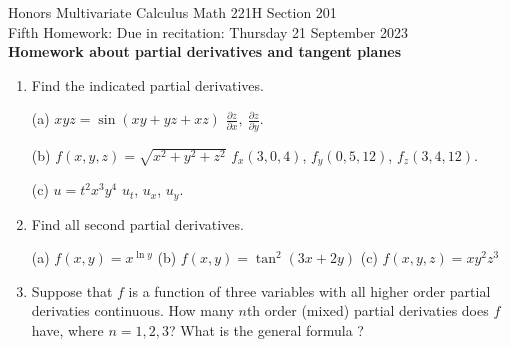 \documentclass[12pt]{article}
\begin{document}
\LARGE 
\noindent
{\color{Maroon}Honors Multivariate Calculus \hfill Math 221H Section 201}\vspace{2pt}\\
\large
Fifth Homework:\hfill 
Due in recitation: Thursday 21 September 2023\\

\normalsize
    {\bf {\color{Maroon}Homework about partial derivatives and tangent planes}}

\begin{enumerate}


  
\item  Find the indicated partial derivatives.

  (a) $xyz=\sin(xy+yz+xz)$ \quad
      ${\displaystyle\frac{\partial z}{\partial x},\ \frac{\partial z}{\partial y}}$.

  (b) $f(x,y,z)=\sqrt{x^2+y^2+z^2}$ \quad $f_x(3,0,4)$, $f_y(0,5,12)$, $f_z(3,4,12)$.

  (c) $u=t^2x^3y^4$ \quad $u_t$, $u_x$, $u_y$.


  
\item  Find all second partial derivatives.

  (a) $f(x,y)=x^{\ln y}$ \qquad (b) $f(x,y)=\tan^2(3x + 2y)$ \qquad (c) $f(x,y,z)=x y^2 z^3$


  
\item    Suppose that $f$ is a function of three variables with all higher order partial derivaties continuous.
  How many $n$th order (mixed) partial derivaties does $f$ have, where $n=1,2,3$?
  What is the general formula ?  



\end{enumerate}
\end{document}
